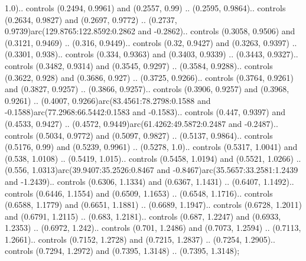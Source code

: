 1.0).. controls (0.2494, 0.9961) and (0.2557, 0.99) .. (0.2595, 0.9864).. controls (0.2634, 0.9827) and (0.2697, 0.9772) .. (0.2737, 0.9739)arc(129.8765:122.8592:0.2862 and -0.2862).. controls (0.3058, 0.9506) and (0.3121, 0.9469) .. (0.316, 0.9449).. controls (0.32, 0.9427) and (0.3263, 0.9397) .. (0.3301, 0.938).. controls (0.334, 0.9363) and (0.3403, 0.9339) .. (0.3443, 0.9327).. controls (0.3482, 0.9314) and (0.3545, 0.9297) .. (0.3584, 0.9288).. controls (0.3622, 0.928) and (0.3686, 0.927) .. (0.3725, 0.9266).. controls (0.3764, 0.9261) and (0.3827, 0.9257) .. (0.3866, 0.9257).. controls (0.3906, 0.9257) and (0.3968, 0.9261) .. (0.4007, 0.9266)arc(83.4561:78.2798:0.1588 and -0.1588)arc(77.2968:66.5442:0.1583 and -0.1583).. controls (0.447, 0.9397) and (0.4533, 0.9427) .. (0.4572, 0.9449)arc(61.4262:49.5872:0.2487 and -0.2487).. controls (0.5034, 0.9772) and (0.5097, 0.9827) .. (0.5137, 0.9864).. controls (0.5176, 0.99) and (0.5239, 0.9961) .. (0.5278, 1.0).. controls (0.5317, 1.0041) and (0.538, 1.0108) .. (0.5419, 1.015).. controls (0.5458, 1.0194) and (0.5521, 1.0266) .. (0.556, 1.0313)arc(39.9407:35.2526:0.8467 and -0.8467)arc(35.5657:33.2581:1.2439 and -1.2439).. controls (0.6306, 1.1334) and (0.6367, 1.1431) .. (0.6407, 1.1492).. controls (0.6446, 1.1554) and (0.6509, 1.1653) .. (0.6548, 1.1716).. controls (0.6588, 1.1779) and (0.6651, 1.1881) .. (0.6689, 1.1947).. controls (0.6728, 1.2011) and (0.6791, 1.2115) .. (0.683, 1.2181).. controls (0.687, 1.2247) and (0.6933, 1.2353) .. (0.6972, 1.242).. controls (0.701, 1.2486) and (0.7073, 1.2594) .. (0.7113, 1.2661).. controls (0.7152, 1.2728) and (0.7215, 1.2837) .. (0.7254, 1.2905).. controls (0.7294, 1.2972) and (0.7395, 1.3148) .. (0.7395, 1.3148);



